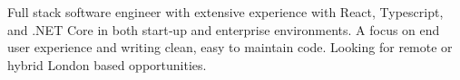 

\begin{cvparagraph}

Full stack software engineer with extensive experience with React, Typescript, and .NET Core in both start‑up and enterprise environments. 
A focus on end user experience and writing clean, easy to maintain code. 
Looking for remote or hybrid London based opportunities.
\end{cvparagraph}
